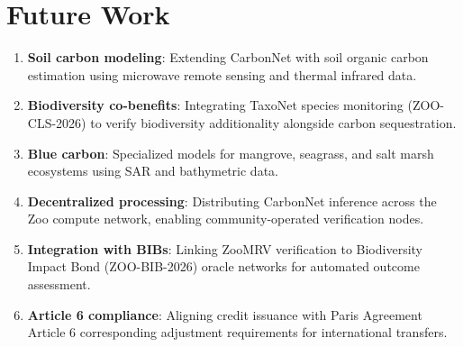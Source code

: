 \section{Future Work}

\label{sec:future}

\begin{enumerate}
  \item \textbf{Soil carbon modeling}: Extending CarbonNet with soil
    organic carbon estimation using microwave remote sensing and thermal
    infrared data.
  \item \textbf{Biodiversity co-benefits}: Integrating TaxoNet species
    monitoring (ZOO-CLS-2026) to verify biodiversity additionality
    alongside carbon sequestration.
  \item \textbf{Blue carbon}: Specialized models for mangrove, seagrass,
    and salt marsh ecosystems using SAR and bathymetric data.
  \item \textbf{Decentralized processing}: Distributing CarbonNet
    inference across the Zoo compute network, enabling community-operated
    verification nodes.
  \item \textbf{Integration with BIBs}: Linking ZooMRV verification
    to Biodiversity Impact Bond (ZOO-BIB-2026) oracle networks for
    automated outcome assessment.
  \item \textbf{Article 6 compliance}: Aligning credit issuance with
    Paris Agreement Article 6 corresponding adjustment requirements for
    international transfers.
\end{enumerate}


